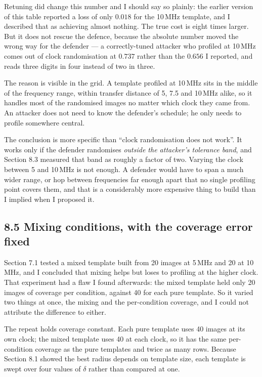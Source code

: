 \documentclass[11pt,a4paper]{article}
\begin{document}
Retuning did change this number and I should say so plainly: the earlier version of this
table reported a loss of only $0.018$ for the 10\,MHz template, and I described that as
achieving almost nothing. The true cost is eight times larger. But it does not rescue the
defence, because the absolute number moved the wrong way for the defender --- a
correctly-tuned attacker who profiled at 10\,MHz comes out of clock randomisation at
$0.737$ rather than the $0.656$ I reported, and reads three digits in four instead of two
in three.

The reason is visible in the grid. A template profiled at 10\,MHz sits in the middle of
the frequency range, within transfer distance of 5, 7.5 and 10\,MHz alike, so it handles
most of the randomised images no matter which clock they came from. An attacker does not
need to know the defender's schedule; he only needs to profile somewhere central.

The conclusion is more specific than ``clock randomisation does not work''. It works only
if the defender randomises \emph{outside the attacker's tolerance band}, and Section 8.3
measured that band as roughly a factor of two. Varying the clock between 5 and 10\,MHz is
not enough. A defender would have to span a much wider range, or hop between frequencies
far enough apart that no single profiling point covers them, and that is a considerably
more expensive thing to build than I implied when I proposed it.

\subsection*{8.5 Mixing conditions, with the coverage error fixed}

Section 7.1 tested a mixed template built from 20 images at 5\,MHz and 20 at 10\,MHz, and
I concluded that mixing helps but loses to profiling at the higher clock. That experiment
had a flaw I found afterwards: the mixed template held only 20 images of coverage per
condition, against 40 for each pure template. So it varied two things at once, the mixing
and the per-condition coverage, and I could not attribute the difference to either.

The repeat holds coverage constant. Each pure template uses 40 images at its own clock;
the mixed template uses 40 at each clock, so it has the same per-condition coverage as the
pure templates and twice as many rows. Because Section 8.1 showed the best radius depends
on template size, each template is swept over four values of $\delta$ rather than compared
at one.
\end{document}
